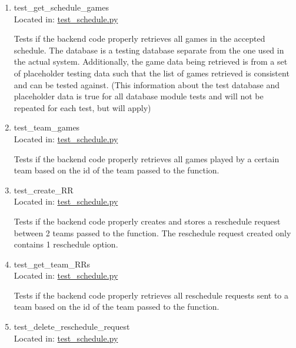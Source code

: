 \documentclass[12pt, titlepage]{article}
\begin{document}
\begin{enumerate}

\item{test\_get\_schedule\_games\\}
  Located in: \href{https://github.com/Nicholas-Fabugais-Inaba/Sandlot/blob/pytest-workflow/test/test\_schedule.py}{test\_schedule.py}
  
  Tests if the backend code properly retrieves all games in the accepted schedule. The 
  database is a testing database separate from the one used in the actual system. 
  Additionally, the game data being retrieved is from a set of placeholder testing data
  such that the list of games retrieved is consistent and can be tested against. (This 
  information about the test database and placeholder data is true for all database module
  tests and will not be repeated for each test, but will apply)

  \item{test\_team\_games\\}
  Located in: \href{https://github.com/Nicholas-Fabugais-Inaba/Sandlot/blob/pytest-workflow/test/test\_schedule.py}{test\_schedule.py}
  
  Tests if the backend code properly retrieves all games played by a certain team based on 
  the id of the team passed to the function.

  \item{test\_create\_RR\\}
  Located in: \href{https://github.com/Nicholas-Fabugais-Inaba/Sandlot/blob/pytest-workflow/test/test\_schedule.py}{test\_schedule.py}
  
  Tests if the backend code properly creates and stores a reschedule request between 2 teams
  passed to the function. The reschedule request created only contains 1 reschedule option.

  \item{test\_get\_team\_RRs\\}
  Located in: \href{https://github.com/Nicholas-Fabugais-Inaba/Sandlot/blob/pytest-workflow/test/test\_schedule.py}{test\_schedule.py}
  
  Tests if the backend code properly retrieves all reschedule requests sent to a team 
  based on the id of the team passed to the function.

  \item{test\_delete\_reschedule\_request\\}
  Located in: \href{https://github.com/Nicholas-Fabugais-Inaba/Sandlot/blob/pytest-workflow/test/test\_schedule.py}{test\_schedule.py}
  

\end{enumerate}
\end{document}
